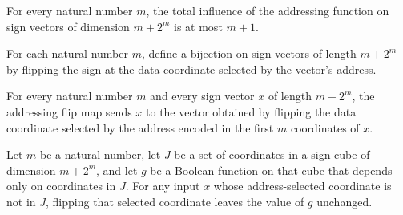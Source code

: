 \begin{theorem}
\label{FABL.totalInfluence_addressingFunction_le}
\leanok
{}
For every natural number $m$, the total influence of the addressing function on sign
vectors of dimension $m+2^m$ is at most $m+1$.
\end{theorem}

\begin{definition}
\label{FABL.addressingFlipEquiv}
\leanok
{}
For each natural number $m$, define a bijection on sign vectors of length $m+2^m$ by
flipping the sign at the data coordinate selected by the vector's address.
\end{definition}

\begin{theorem}
\label{FABL.addressingFlipEquiv_apply}
\leanok
{}
For every natural number $m$ and every sign vector $x$ of length $m+2^m$, the addressing
flip map sends $x$ to the vector obtained by flipping the data coordinate selected by
the address encoded in the first $m$ coordinates of $x$.
\end{theorem}

\begin{theorem}
\label{FABL.eq_addressingFlip_of_dependsOn}
\leanok
{}
Let $m$ be a natural number, let $J$ be a set of coordinates in a sign cube of dimension
$m+2^m$, and let $g$ be a Boolean function on that cube that depends only on coordinates
in $J$. For any input $x$ whose address-selected coordinate is not in $J$, flipping that
selected coordinate leaves the value of $g$ unchanged.
\end{theorem}

